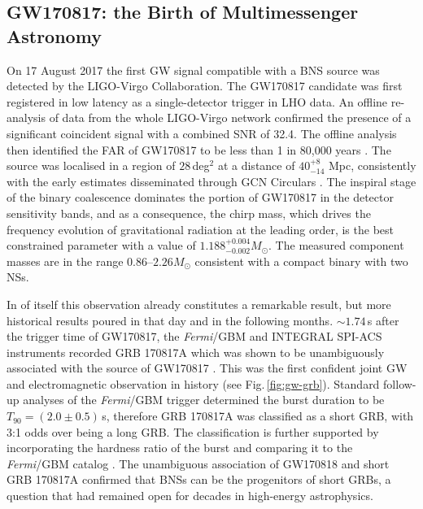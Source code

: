 \documentclass[binding=0.6cm, LaM]{sapthesis}
\begin{document}
\subsection{GW170817: the Birth of Multimessenger Astronomy}
\label{subsec:GW170817}
	On 17 August 2017 the first GW signal compatible with a BNS source 
	was detected by the LIGO-Virgo Collaboration.  
	The GW170817 candidate was first registered in low latency \cite{112,114}
	as a single-detector trigger in LHO data. 
	An offline re-analysis \cite{28,111} of data from the whole LIGO-Virgo network 
	confirmed the presence of a significant coincident signal with a combined SNR of 32.4.
	The offline analysis then identified the FAR of GW170817 to be less than 1 in 80,000 years \cite{61}. 
	The source was localised \cite{59,152} in a region of $28\,$deg$^2$ at a distance of $40^{+8}_{-14}$ Mpc, 
	consistently with the early estimates disseminated through GCN Circulars \cite{55,60}.
	The inspiral stage of the binary coalescence dominates 
	the portion of GW170817 in the detector sensitivity bands, 
	and as a consequence, the chirp mass, 
	which drives the frequency evolution of gravitational radiation at the leading order, 
	is the best constrained parameter with a value of $1.188^{+0.004}_{-0.002}M_\odot$.
	The measured component masses are in the range $0.86$--$2.26M_\odot$
	consistent with a compact binary with two NSs.

        In of itself this observation already constitutes a remarkable result, 
	but more historical results poured in that day and in the following months.  
	$\sim1.74$\,s after the trigger time of GW170817, the {\it Fermi}/GBM and INTEGRAL SPI-ACS instruments 
	recorded GRB 170817A \cite{147} which was shown to be unambiguously associated 
	with the source of GW170817 \cite{55}.  
	This was the first confident joint GW and electromagnetic observation in history (see Fig.\,\ref{fig:gw-grb}).
	Standard follow-up analyses \cite{108,110} of the {\it Fermi}/GBM trigger 
	determined the burst duration to be $T_{90} = (2.0 \pm 0.5)\,$s,
	therefore GRB 170817A was classified as a short GRB, with 3:1 odds over being a long GRB.
        The classification is further supported by incorporating 
	the hardness ratio of the burst and comparing it to the {\it Fermi}/GBM catalog \cite{110}.  
	The unambiguous association of GW170818 and short GRB 170817A confirmed that BNSs 
	can be the progenitors of short GRBs, a question that had remained open for decades in high-energy astrophysics.
\end{document}
